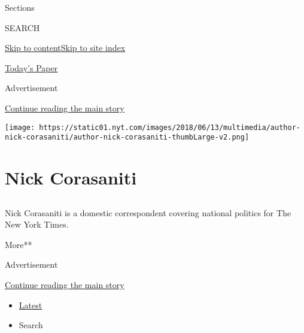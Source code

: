 Sections

SEARCH

\protect\hyperlink{site-content}{Skip to
content}\protect\hyperlink{site-index}{Skip to site index}

\href{https://myaccount.nytimes.com/auth/login?response_type=cookie\&client_id=vi}{}

\href{https://www.nytimes.com/section/todayspaper}{Today's Paper}

Advertisement

\protect\hyperlink{after-top}{Continue reading the main story}

\texttt{[image: https://static01.nyt.com/images/2018/06/13/multimedia/author-nick-corasaniti/author-nick-corasaniti-thumbLarge-v2.png]}

\hypertarget{nick-corasaniti}{%
\section{Nick Corasaniti}\label{nick-corasaniti}}

\hypertarget{section}{%
\subsection{}\label{section}}

Nick Corasaniti is a domestic correspondent covering national politics
for The New York Times.

More**

Advertisement

\protect\hyperlink{after-mid1}{Continue reading the main story}

\begin{itemize}
\tightlist
\item
  \protect\hyperlink{stream-panel}{Latest}
\item
  Search
\end{itemize}

